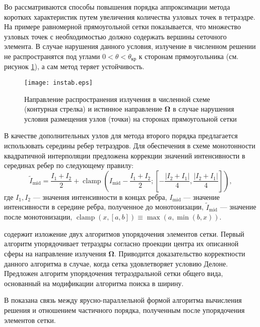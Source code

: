 Во  рассматриваются способы повышения порядка аппроксимации метода коротких характеристик путем увеличения количества узловых точек в тетраэдре. На примере равномерной прямоугольной сетки показывается, что множество узловых точек с необходимостью должно содержать вершины сеточного элемента. В случае нарушения данного условия, излучение в численном решении не распространятся под углами $0 < \theta < \theta_\text{кр}$ к сторонам прямоугольника (см. рисунок \ref{fig:instab}), а сам метод теряет устойчивость.
\begin{figure}[ht!]
\centering
\texttt{[image: instab.eps]}
\caption{Направление распространения излучения в численной схеме (контурная стрелка) и истинное направление $\boldsymbol \Omega$ в случае нарушения условия размещения узлов (точки) на сторонах прямоугольной сетки}
\label{fig:instab}
\end{figure}

В качестве дополнительных узлов для метода второго порядка предлагается использовать середины ребер тетраэдров. Для обеспечения в схеме монотонности квадратичной интерполяции предложена коррекции значений интенсивности в серединах ребер по следующему правилу:
\[
\tilde I_\text{mid} = \frac{I_1 + I_2}{2} + \operatorname{clamp}\left(
I_\text{mid} - \frac{I_1 + I_2}{2}; \left[
- \frac{|I_2 + I_1|}{4}, \frac{|I_2 + I_1|}{4}
\right]
\right),
\]
где $I_1, I_2$ --- значения интенсивности в концах ребра, $I_\text{mid}$ --- значение интенсивности в середине ребра, полученное до монотонизации, $\tilde I_\text{mid}$ --- значение после монотонизации, $\operatorname{clamp}(x, [a, b]) \equiv \max(a, \min(b, x))$.

 содержит изложение двух алгоритмов упорядочения элементов сетки. Первый алгоритм упорядочивает тетраэдры согласно проекции центра их описанной сферы на направление излучения $\boldsymbol \Omega$. Приводится доказательство корректности данного алгоритма в случае, когда сетка удовлетворяет условию Делоне. Предложен алгоритм упорядочения тетраэдральной сетки общего вида, основанный на модификации алгоритма поиска в ширину.

В  показана связь между ярусно-параллельной формой алгоритма вычисления решения и отношением частичного порядка, полученным после упорядочения элементов сетки.


